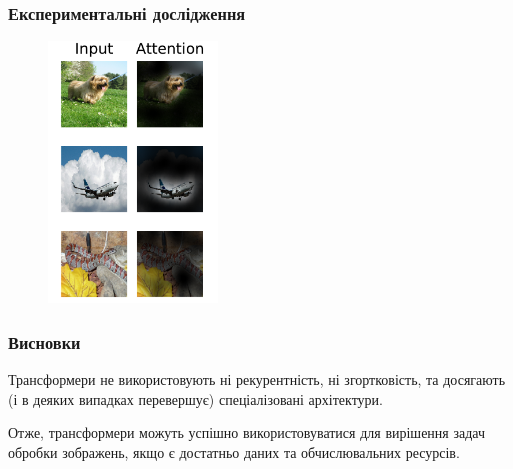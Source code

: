 \documentclass{beamer}
\begin{document}
\begin{frame}
    \frametitle{Експериментальні дослідження}
    \begin{figure}[H]
        \centering
        \includegraphics[width=0.4\textwidth]{attention-repr.png}
    \end{figure}

\end{frame}

\begin{frame}
    \frametitle{Висновки}
    Трансформери не використовують ні рекурентність, ні згортковість,
    та досягають (і в деяких випадках перевершує) спеціалізовані архітектури.

    Отже, трансформери можуть успішно використовуватися для вирішення
    задач обробки зображень, якщо є достатньо даних та
    обчислювальних ресурсів.

\end{frame}
\end{document}

